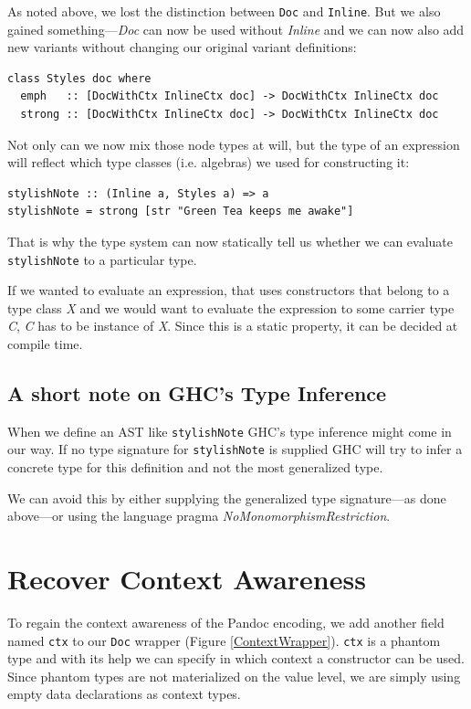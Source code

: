 As noted above, we lost the distinction between \texttt{Doc} and
\texttt{Inline}. But we also gained something—\emph{Doc} can now be used
without \emph{Inline} and we can now also add new variants without changing our
original variant definitions:

\begin{lstlisting}
class Styles doc where
  emph   :: [DocWithCtx InlineCtx doc] -> DocWithCtx InlineCtx doc
  strong :: [DocWithCtx InlineCtx doc] -> DocWithCtx InlineCtx doc
\end{lstlisting}

Not only can we now mix those node types at will, but the type of an expression
will reflect which type classes (i.e. algebras) we used for constructing it:

\begin{lstlisting}
stylishNote :: (Inline a, Styles a) => a
stylishNote = strong [str "Green Tea keeps me awake"]
\end{lstlisting}

That is why the type system can now statically tell us whether we can evaluate
\texttt{stylishNote} to a particular type.

If we wanted to evaluate an expression, that uses constructors that belong to a
type class \emph{X} and we would want to evaluate the expression to some carrier
type \emph{C}, \emph{C} has to be instance of \emph{X}. Since this is a static
property, it can be decided at compile time.

\subsection{A short note on GHC’s Type Inference}

When we define an AST like \texttt{stylishNote} GHC’s type inference might come
in our way. If no type signature for \texttt{stylishNote} is supplied GHC will
try to infer a concrete type for this definition and not the most generalized
type.

We can avoid this by either supplying the generalized type signature—as done
above—or using the language pragma \emph{NoMonomorphismRestriction}.

\section{Recover Context Awareness}

To regain the context awareness of the Pandoc encoding, we add another field
named \texttt{ctx} to our \texttt{Doc} wrapper (Figure \ref{ContextWrapper}).
\texttt{ctx} is a phantom type and with its help we can specify in which
context a constructor can be used. Since phantom types are not materialized on
the value level, we are simply using empty data declarations as context types.

